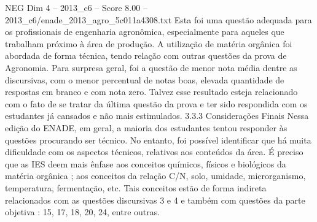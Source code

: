 \begin{textsample}{NEG Dim 4 – 2013\_c6 – Score 8.00 – 2013\_c6/enade\_2013\_agro\_5c011a4308.txt}
Esta foi uma questão adequada para os profissionais de engenharia agronômica, especialmente para aqueles que trabalham próximo à área de produção.
A utilização de matéria orgânica foi abordada de forma técnica, tendo relação com outras questões da prova de Agronomia.
Para surpresa geral, foi a questão de menor nota média dentre as discursivas, com o menor percentual de notas boas, elevada quantidade de respostas em branco e com nota zero.
Talvez esse resultado esteja relacionado com o fato de se tratar da última questão da prova e ter sido respondida com os estudantes já cansados e não mais estimulados. 3.3.3 Considerações Finais Nessa edição do ENADE, em geral, a maioria dos estudantes tentou responder às questões procurando ser técnico.
No entanto, foi possível identificar que há muita dificuldade com os aspectos técnicos, relativos aos conteúdos da área.
É preciso que as IES deem mais ênfase aos conceitos químicos, físicos e biológicos da matéria orgânica ; aos conceitos da relação C/N, solo, umidade, microrganismo, temperatura, fermentação, etc.
Tais conceitos estão de forma indireta relacionados com as questões discursivas 3 e 4 e também com questões da parte objetiva : 15, 17, 18, 20, 24, entre outras.

\end{textsample}
